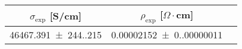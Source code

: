 \begin{tabular}{ccc}
\toprule
$\sigma_{\exp}$ [S/cm] & $\rho_{\exp}$ [$\Omega  \cdot$cm] \\
\midrule
\num{46467.391(244.215)} & \num{0.00002152(0.00000011)} \\
\bottomrule
\end{tabular}
